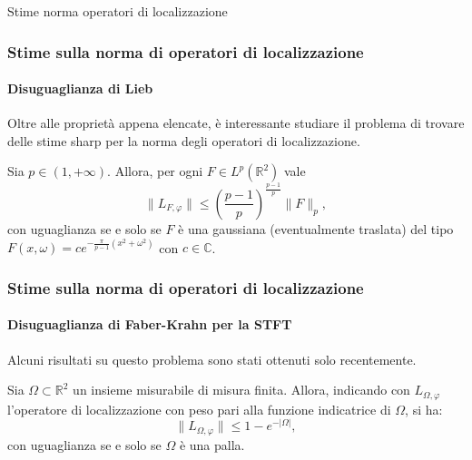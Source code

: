 \documentclass[aspectratio=141]{beamer}
\newcommand{\R}{\mathbb{R}} %
\newcommand{\V}{\mathcal{V}} %
\newcommand{\C}{\mathbb{C}} %
\begin{document}
\begin{section}{Stime norma operatori di localizzazione}
	
	\begin{frame}
		\frametitle{Stime sulla norma di operatori di localizzazione}
		\framesubtitle{Disuguaglianza di Lieb}
		Oltre alle proprietà appena elencate, è interessante studiare il problema di trovare delle stime sharp per la norma degli operatori di localizzazione.
		\pause
		\begin{myblock}
			Sia $p \in (1,+\infty)$. Allora, per ogni $F \in L^p(\R^2)$ vale
			\begin{equation}\label{stima Lieb}
				\|L_{F,\varphi}\| \leq \left(\dfrac{p-1}{p}\right)^{\frac{p-1}{p}} \|F\|_p,
			\end{equation}
			con uguaglianza se e solo se $F$ è una gaussiana (eventualmente traslata) del tipo $F(x,\omega) = c e^{-\frac{\pi}{p-1}(x^2+\omega^2)}$ con $c \in \C$.
		\end{myblock}
	\end{frame}

	\begin{frame}
		\frametitle{Stime sulla norma di operatori di localizzazione}
		\framesubtitle{Disuguaglianza di Faber-Krahn per la STFT}
		Alcuni risultati su questo problema sono stati ottenuti solo recentemente.
		\begin{myblock}
			Sia $\Omega \subset \R^2$ un insieme misurabile di misura finita. Allora, indicando con $L_{\Omega, \varphi}$ l'operatore di localizzazione con peso pari alla funzione indicatrice di $\Omega$, si ha:
			\begin{equation*}
				\|L_{\Omega, \varphi}\| \leq 1 - e^{- |\Omega|},
			\end{equation*}
			con uguaglianza se e solo se $\Omega$ è una palla.
		\end{myblock}
	\end{frame}
	

\end{section}
\end{document}
